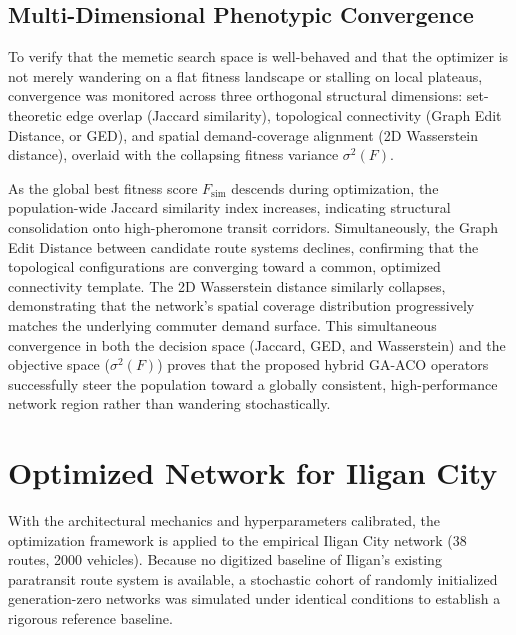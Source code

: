 \subsection{Multi-Dimensional Phenotypic Convergence}
To verify that the memetic search space is well-behaved and that the optimizer is not merely wandering on a flat fitness landscape or stalling on local plateaus, convergence was monitored across three orthogonal structural dimensions: set-theoretic edge overlap (Jaccard similarity), topological connectivity (Graph Edit Distance, or GED), and spatial demand-coverage alignment (2D Wasserstein distance), overlaid with the collapsing fitness variance $\sigma^2(F)$. 

As the global best fitness score $F_{\text{sim}}$ descends during optimization, the population-wide Jaccard similarity index increases, indicating structural consolidation onto high-pheromone transit corridors. Simultaneously, the Graph Edit Distance between candidate route systems declines, confirming that the topological configurations are converging toward a common, optimized connectivity template. The 2D Wasserstein distance similarly collapses, demonstrating that the network's spatial coverage distribution progressively matches the underlying commuter demand surface. This simultaneous convergence in both the decision space (Jaccard, GED, and Wasserstein) and the objective space ($\sigma^2(F)$) proves that the proposed hybrid GA-ACO operators successfully steer the population toward a globally consistent, high-performance network region rather than wandering stochastically.

\section{Optimized Network for Iligan City}
\noindent
With the architectural mechanics and hyperparameters calibrated, the optimization framework is applied to the empirical Iligan City network (38 routes, 2000 vehicles). Because no digitized baseline of Iligan's existing paratransit route system is available, a stochastic cohort of randomly initialized generation-zero networks was simulated under identical conditions to establish a rigorous reference baseline.

